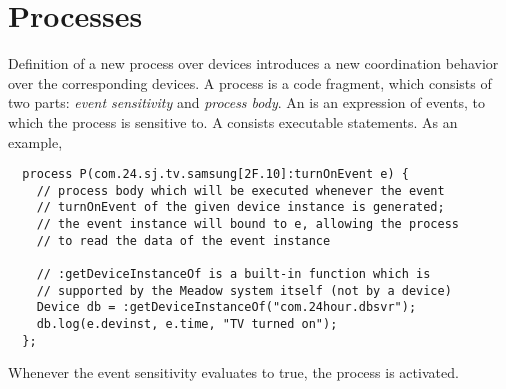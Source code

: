 \documentclass{myproc}
\begin{document}
\section{Processes}\label{sec:proc}
Definition of a new process over devices introduces a new coordination
behavior over the corresponding devices.
A process is a code fragment, which consists of two parts:
{\em event sensitivity\/} and {\em process body\/}. 
An  is an expression of events, 
to which the process is
sensitive to. A  consists executable statements.
As an example,
\begin{verbatim}
  process P(com.24.sj.tv.samsung[2F.10]:turnOnEvent e) {
    // process body which will be executed whenever the event
    // turnOnEvent of the given device instance is generated;
    // the event instance will bound to e, allowing the process
    // to read the data of the event instance

    // :getDeviceInstanceOf is a built-in function which is 
    // supported by the Meadow system itself (not by a device)
    Device db = :getDeviceInstanceOf("com.24hour.dbsvr");
    db.log(e.devinst, e.time, "TV turned on");
  };
\end{verbatim}
Whenever the event sensitivity evaluates to true, the process is
activated. 



\end{document}
